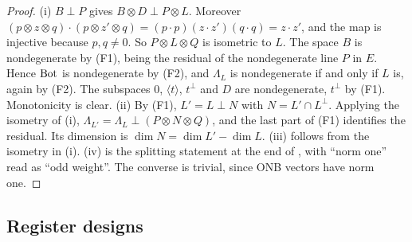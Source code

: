\begin{proof}
(i) $B\perp P$ gives $B\otimes D\perp P\otimes L$. Moreover
$(p\otimes z\otimes q)\cdot(p\otimes z'\otimes q)=(p\cdot p)(z\cdot z')(q\cdot q)=z\cdot z'$, and the map is
injective because $p,q\ne0$. So $P\otimes L\otimes Q$ is isometric to $L$. The space $B$ is
nondegenerate by (F1), being the residual of the nondegenerate line $P$ in $E$. Hence $\mathrm{Bot}$ is
nondegenerate by (F2), and $\Lambda_L$ is nondegenerate if and only if $L$ is, again by (F2). The
subspaces $0$, $\langle t\rangle$, $t^\perp$ and $D$ are nondegenerate, $t^\perp$ by (F1). Monotonicity is
clear.
(ii) By (F1), $L'=L\perp N$ with $N=L'\cap L^\perp$. Applying the isometry of (i),
$\Lambda_{L'}=\Lambda_L\perp(P\otimes N\otimes Q)$, and the last part of (F1) identifies the residual. Its
dimension is $\dim N=\dim L'-\dim L$. (iii) follows from the isometry in (i). (iv) is the splitting
statement at the end of \cite[\S2.3]{oai}, with ``norm one'' read as ``odd weight''. The converse is
trivial, since ONB vectors have norm one.
\end{proof}

\subsection{Register designs}\label{col:sec:designs-def}

